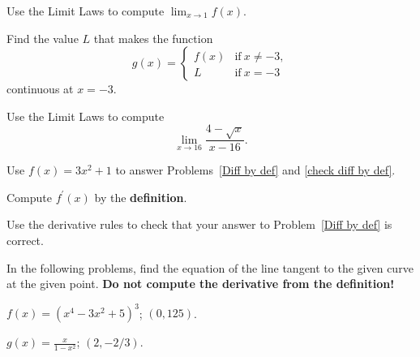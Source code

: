 \documentclass[12pt]{amsart}
\begin{document}
\vspace{2in}

\begin{thm}[5 Points]\label{infinite limit}
  Use the Limit Laws to compute \(\lim_{x \to 1} f(x)\).
\end{thm}

\vspace{2in}

\begin{thm}[3 Points]\label{fix discont}
    Find the value \(L\) that makes the function
    \[g(x) = \left\{\begin{matrix}
    f(x) & \text{if}\ x \neq -3,\\
    L & \text{if}\ x = -3
    \end{matrix}
    \right.\]
    continuous at \(x = -3\).
\end{thm}

\newpage

\begin{thm}[10 Points]
  Use the Limit Laws to compute
  \[\lim_{x \to 16} \frac{4 - \sqrt{x}}{x - 16}.\]
\end{thm}

\vspace{3in}

\noindent Use \(f(x) = 3x^2 + 1\) to answer Problems~\ref{Diff by def} and \ref{check diff by def}.

\begin{thm}[10 Points]\label{Diff by def}
  Compute \(f^\prime(x)\) by the \textbf{definition}.
\end{thm}

\vspace{3in}

\begin{thm}[5 Points]\label{check diff by def}
  Use the derivative rules to check that your answer to Problem~\ref{Diff by def} is correct.
\end{thm}

\newpage

\noindent In the following problems, find the equation of the line tangent to the given curve at the given point.
\textbf{Do not compute the derivative from the definition!}
\begin{thm}[15 Points]
  \(\displaystyle{f(x) = (x^4 - 3x^2 + 5)^3}\); \((0,125)\).
\end{thm}

\vspace{2in}
\begin{thm}[15 Points]
  \(\displaystyle{g(x) = \frac{x}{1 - x^2}}\); \((2,-2/3)\).
\end{thm}
\end{document}
